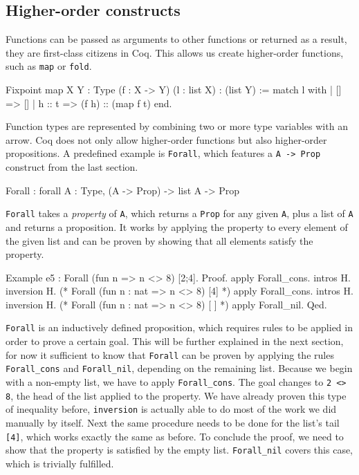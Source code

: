\documentclass[paper = a4, fleqn, abstract=on, twoside]{scrreprt}
\newcommand{\todo}[1]{\marginpar{\textbf{TODO:} #1}}
\newcommand{\coqinline}[1]{\texttt{#1}}
\begin{document}
\subsection{Higher-order constructs}
Functions can be passed as arguments to other functions or returned as a result, they are first-class citizens in Coq. This allows us create higher-order functions, such as \coqinline{map} or \coqinline{fold}.
\todo{minted bug?}
\begin{coqcode}
Fixpoint map {X Y : Type} (f : X -> Y) (l : list X) : (list Y) :=
  match l with
  | []     => []
  | h :: t => (f h) :: (map f t)
  end.
\end{coqcode}
Function types are represented by combining two or more type variables with an arrow. Coq does not only allow higher-order functions but also higher-order propositions. A predefined example is \coqinline{Forall}, which features a \coqinline{A -> Prop} construct from the last section.
\begin{coqcode}
Forall : forall A : Type, (A -> Prop) -> list A -> Prop
\end{coqcode}
\coqinline{Forall} takes a \textit{property} of \coqinline{A}, which returns a \coqinline{Prop} for any given \coqinline{A}, plus a list of \coqinline{A} and returns a proposition. It works by applying the property to every element of the given list and can be proven by showing that all elements satisfy the property.
\begin{coqcode}
Example e5 : Forall (fun n => n <> 8) [2;4].
Proof.
apply Forall_cons. intros H. inversion H.
(* Forall (fun n : nat => n <> 8) [4] *)
apply Forall_cons. intros H. inversion H.
(* Forall (fun n : nat => n <> 8) [ ] *)
apply Forall_nil.
Qed.
\end{coqcode}
\coqinline{Forall} is an inductively defined proposition, which requires rules to be applied in order to prove a certain goal. This will be further explained in the next section, for now it sufficient to know that \coqinline{Forall} can be proven by applying the rules \coqinline{Forall_cons} and \coqinline{Forall_nil}, depending on the remaining list. Because we begin with a non-empty list, we have to apply \coqinline{Forall_cons}. The goal changes to \coqinline{2 <> 8}, the head of the list applied to the property. We have already proven this type of inequality before, \coqinline{inversion} is actually able to do most of the work we did manually by itself. Next the same procedure needs to be done for the list's tail \coqinline{[4]}, which works exactly the same as before. To conclude the proof, we need to show that the property is satisfied by the empty list. \coqinline{Forall_nil} covers this case, which is trivially fulfilled.
\end{document}
